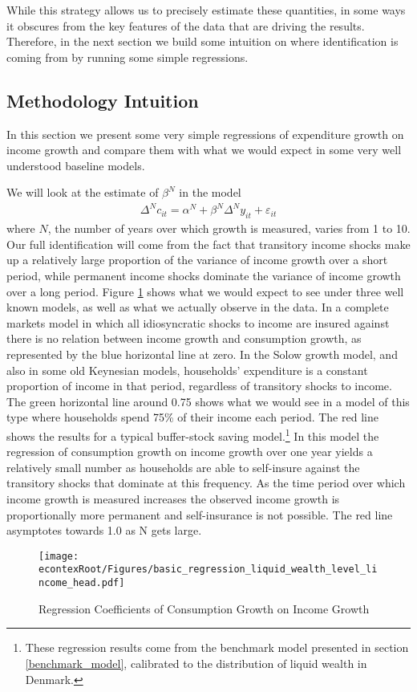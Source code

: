 \documentclass[titlepage]{\econtex}\newcommand{\texname}{ConsumptionHeterogeneity}
\begin{document}
 While this strategy allows us to precisely estimate these quantities, in some ways it obscures from the key features of the data that are driving the results. Therefore, in the next section we build some intuition on where identification is coming from by running some simple regressions.

\subsection{Methodology Intuition}
In this section we present some very simple regressions of expenditure growth on income growth and compare them with what we would expect in some very well understood baseline models.

We will look at the estimate of $\beta^N$ in the model
\begin{align*}
    \Delta^N c_{it} = \alpha^N + \beta^N \Delta^N y_{it} + \varepsilon_{it}
\end{align*}
where $N$, the number of years over which growth is measured, varies from 1 to 10. Our full identification will come from the fact that transitory income shocks make up a relatively large proportion of the variance of income growth over a short period, while permanent income shocks dominate the variance of income growth over a long period. Figure \ref{fig:GrowthReg} shows what we would expect to see under three well known models, as well as what we actually observe in the data. In a complete markets model in which all idiosyncratic shocks to income are insured against there is no relation between income growth and consumption growth, as represented by the blue horizontal line at zero. In the Solow growth model, and also in some old Keynesian models, households' expenditure is a constant proportion of income in that period, regardless of transitory shocks to income. The green horizontal line around 0.75 shows what we would see in a model of this type where households spend 75\% of their income each period. The red line shows the results for a typical buffer-stock saving model.\footnote{These regression results come from the benchmark model presented in section \ref{benchmark_model}, calibrated to the distribution of liquid wealth in Denmark.} In this model the regression of consumption growth on income growth over one year yields a relatively small number as households are able to self-insure against the transitory shocks that dominate at this frequency. As the time period over which income growth is measured increases the observed income growth is proportionally more permanent and self-insurance is not possible. The red line asymptotes towards 1.0 as N gets large.
	\begin{figure} 
	\begin{centering}
		\texttt{[image: \\econtexRoot/Figures/basic\_regression\_liquid\_wealth\_level\_lincome\_head.pdf]}
		\caption{Regression Coefficients of Consumption Growth on Income Growth}
		\label{fig:GrowthReg}
	\end{centering}
\end{figure}
\end{document}
